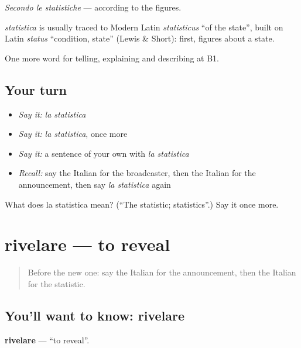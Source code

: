 \emph{Secondo le statistiche} — according to the figures.

\begin{cousinweb}
\emph{statistica} is usually traced to Modern Latin \emph{statisticus} \textquotedblleft{}of the state\textquotedblright{}, built on Latin \emph{status} \textquotedblleft{}condition, state\textquotedblright{} (Lewis \& Short): first, figures about a state.
\end{cousinweb}

\begin{grammarlens}[title={What you've built}]
One more word for telling, explaining and describing at B1.
\end{grammarlens}

\subsection*{Your turn}
\begin{itemize}
\raggedright
  \item \emph{Say it:} \emph{la statistica}
  \item \emph{Say it:} \emph{la statistica}, once more
  \item \emph{Say it:} a sentence of your own with \emph{la statistica}
  \item \emph{Recall:} say the Italian for the broadcaster, then the Italian for the announcement, then say \emph{la statistica} again
\end{itemize}

\begin{tcolorbox}[breakable,colback=teal!4,colframe=teal!35!black,title={Before you move on}]
What does la statistica mean? (\textquotedblleft{}The statistic; statistics\textquotedblright{}.) Say it once more.
\end{tcolorbox}
\section[rivelare]{rivelare — to reveal}

\label{lesson:IT-C288-rivelare}



\begin{quote}
Before the new one: say the Italian for the announcement, then the Italian for the statistic.
\end{quote}

\subsection*{You'll want to know: rivelare}
\textbf{rivelare} — \textquotedblleft{}to reveal\textquotedblright{}.

